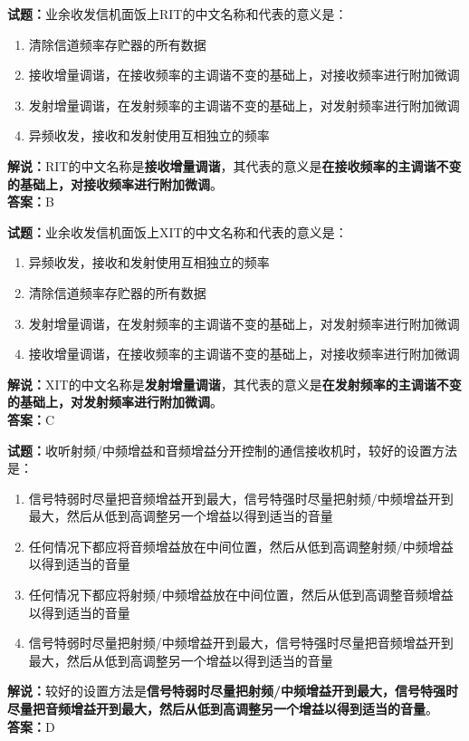 \documentclass{ctexbook}
\begin{document}
\bigskip


\noindent\textbf{试题：}业余收发信机面饭上RIT的中文名称和代表的意义是：
\begin{enumerate}[leftmargin=3em]
\item 清除信道频率存贮器的所有数据
\item 接收增量调谐，在接收频率的主调谐不变的基础上，对接收频率进行附加微调
\item 发射增量调谐，在发射频率的主调谐不变的基础上，对发射频率进行附加微调
\item 异频收发，接收和发射使用互相独立的频率
\end{enumerate}
\noindent\textbf{解说：}RIT的中文名称是\textbf{接收增量调谐}，其代表的意义是\textbf{在接收频率的主调谐不变的基础上，对接收频率进行附加微调}。\\\noindent\textbf{答案：}B




\bigskip


\noindent\textbf{试题：}业余收发信机面饭上XIT的中文名称和代表的意义是：
\begin{enumerate}[leftmargin=3em]
\item 异频收发，接收和发射使用互相独立的频率
\item 清除信道频率存贮器的所有数据
\item 发射增量调谐，在发射频率的主调谐不变的基础上，对发射频率进行附加微调
\item 接收增量调谐，在接收频率的主调谐不变的基础上，对接收频率进行附加微调
\end{enumerate}
\noindent\textbf{解说：}XIT的中文名称是\textbf{发射增量调谐}，其代表的意义是\textbf{在发射频率的主调谐不变的基础上，对发射频率进行附加微调}。\\\noindent\textbf{答案：}C




\bigskip


\noindent\textbf{试题：}收听射频/中频增益和音频增益分开控制的通信接收机时，较好的设置方法是：
\begin{enumerate}[leftmargin=3em]
\item 信号特弱时尽量把音频增益开到最大，信号特强时尽量把射频/中频增益开到最大，然后从低到高调整另一个增益以得到适当的音量
\item 任何情况下都应将音频增益放在中间位置，然后从低到高调整射频/中频增益以得到适当的音量
\item 任何情况下都应将射频/中频增益放在中间位置，然后从低到高调整音频增益以得到适当的音量
\item 信号特弱时尽量把射频/中频增益开到最大，信号特强时尽量把音频增益开到最大，然后从低到高调整另一个增益以得到适当的音量
\end{enumerate}
\noindent\textbf{解说：}较好的设置方法是\textbf{信号特弱时尽量把射频/中频增益开到最大，信号特强时尽量把音频增益开到最大，然后从低到高调整另一个增益以得到适当的音量}。\\\noindent\textbf{答案：}D
\end{document}
